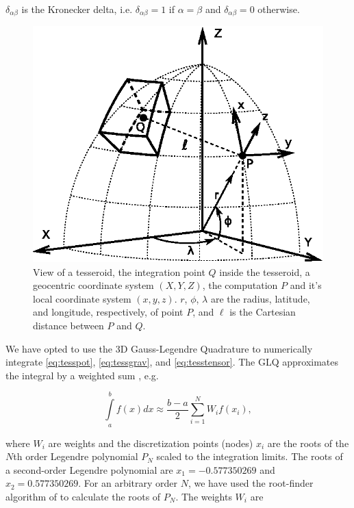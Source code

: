 \noindent
$\delta_{\alpha\beta}$ is the Kronecker delta,
i.e. $\delta_{\alpha\beta}=1$ if $\alpha=\beta$
and $\delta_{\alpha\beta}=0$ otherwise.

\begin{figure}
    \centering
    \includegraphics{figs/tesseroid}
    \caption{
        View of a tesseroid,
        the integration point $Q$ inside the tesseroid,
        a geocentric coordinate system $(X, Y, Z)$,
        the computation $P$ and it's local coordinate system $(x, y, z)$.
        $r$, $\phi$, $\lambda$ are
        the radius, latitude, and longitude, respectively, of point $P$,
        and $\ell$ is the Cartesian distance between $P$ and $Q$.
    }
    \label{fig:tesseroid}
\end{figure}

We have opted to use
the 3D Gauss-Legendre Quadrature
to numerically integrate
\ref{eq:tesspot},
\ref{eq:tessgrav},
and
\ref{eq:tesstensor}.
The GLQ
approximates the integral by
a weighted sum
\citep{Hildebrand1987},
e.g.

\begin{equation}
    \int\limits_a^b f(x) dx \approx
    \frac{b-a}{2}\sum\limits_{i=1}^N W_i f(x_i),
\end{equation}

\noindent
where
$W_i$ are weights and
the discretization points (nodes) $x_i$
are the roots of the $N$th order Legendre polynomial $P_N$
scaled to the integration limits.
The roots of a second-order Legendre polynomial are
$x_1=-0.577350269$ and $x_2=0.577350269$.
For an arbitrary order $N$,
we have used the root-finder algorithm
of \citet{Barrera-Figueroa2006}
to calculate the roots of $P_N$.
The weights $W_i$ are \citep{Hildebrand1987}

